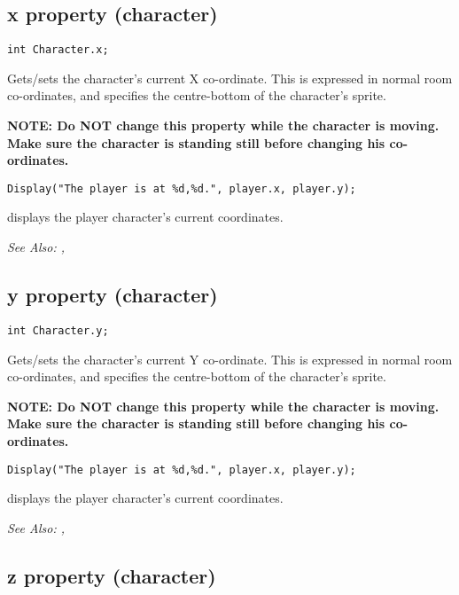 \subsection{x property (character)}\label{Character.x}%

\begin{verbatim}
int Character.x;
\end{verbatim}

Gets/sets the character's current X co-ordinate. This is expressed in normal room
co-ordinates, and specifies the centre-bottom of the character's sprite.

\bf{NOTE:} Do \bf{NOT} change this property while the character is moving. Make
sure the character is standing still before changing his co-ordinates.

\begin{verbatim}
Display("The player is at %d,%d.", player.x, player.y);
\end{verbatim}
displays the player character's current coordinates.

\it{See Also:} ,


\subsection{y property (character)}\label{Character.y}%

\begin{verbatim}
int Character.y;
\end{verbatim}

Gets/sets the character's current Y co-ordinate. This is expressed in normal room
co-ordinates, and specifies the centre-bottom of the character's sprite.

\bf{NOTE:} Do \bf{NOT} change this property while the character is moving. Make
sure the character is standing still before changing his co-ordinates.

\begin{verbatim}
Display("The player is at %d,%d.", player.x, player.y);
\end{verbatim}
displays the player character's current coordinates.

\it{See Also:} ,


\subsection{z property (character)}\label{Character.z}%

